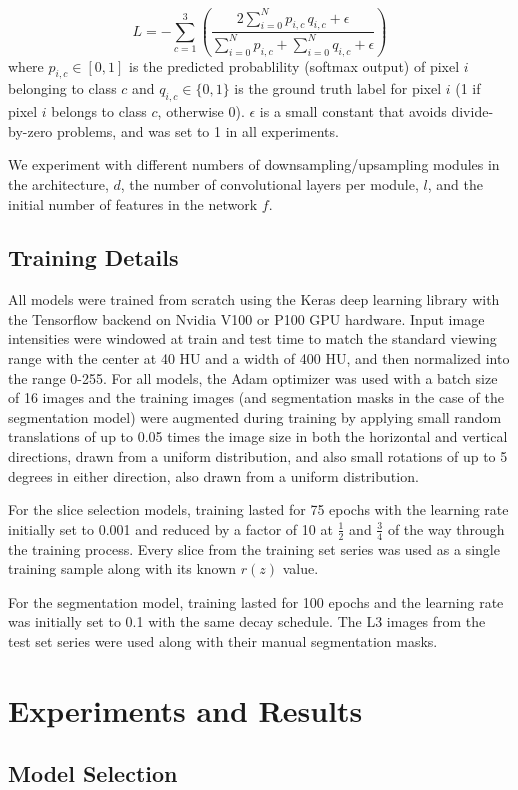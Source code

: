 \documentclass{llncs}
\begin{document}
\begin{equation}
	L = - \sum_{c=1}^{3} \left(  \frac{2\sum_{i=0}^N p_{i,c} \, q_{i,c} + \epsilon}{\sum_{i=0}^N p_{i,c} + \sum_{i=0}^N q_{i,c} + \epsilon} \right)
\end{equation}\noindent where $p_{i,c} \in [0, 1]$ is the predicted probablility (softmax output) of pixel $i$ belonging to class $c$ and $q_{i,c} \in \lbrace 0, 1 \rbrace$ is the ground truth label for pixel $i$ (1 if pixel $i$ belongs to class $c$, otherwise 0).
$\epsilon$ is a small constant that avoids divide-by-zero problems, and was set to 1 in all experiments.

We experiment with different numbers of downsampling/upsampling modules in the architecture, $d$, the number of convolutional layers per module, $l$, and the initial number of features in the network $f$.
\subsection{Training Details}

All models were trained from scratch using the Keras deep learning library with the Tensorflow backend on Nvidia V100 or P100 GPU hardware.
Input image intensities were windowed at train and test time to match the standard viewing range with the center at 40 HU and a width of 400 HU, and then normalized into the range 0-255.
For all models, the Adam optimizer was used with a batch size of 16 images and the training images (and segmentation masks in the case of the segmentation model) were augmented during training by applying small random translations of up to 0.05 times the image size in both the horizontal and vertical directions, drawn from a uniform distribution, and also small rotations of up to 5 degrees in either direction, also drawn from a uniform distribution.

For the slice selection models, training lasted for 75 epochs with the learning rate initially set to 0.001 and reduced by a factor of 10 at $\frac{1}{2}$ and $\frac{3}{4}$ of the way through the training process.
Every slice from the training set series was used as a single training sample along with its known $r\left( z \right)$ value.

For the segmentation model, training lasted for 100 epochs and the learning rate was initially set to 0.1 with the same decay schedule.
The L3 images from the test set series were used along with their manual segmentation masks.

\section{Experiments and Results}\label{sec:results}\subsection{Model Selection}\label{ssec:model_selection}
\end{document}
